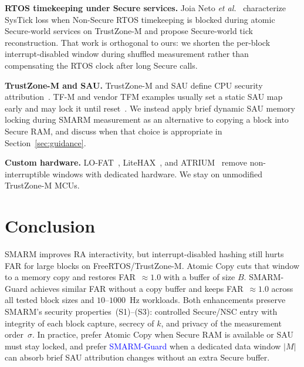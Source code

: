 \documentclass[conference]{IEEEtran}
\newcommand{\smarmlock}{SMARM-Guard\xspace}
\newcommand\ben[1]{\textcolor{blue}{#1}}
\begin{document}
\textbf{RTOS timekeeping under Secure services.}
Joia Neto \emph{et al.}~\cite{joianeto2026timekeeping} characterize
SysTick loss when Non-Secure RTOS timekeeping is blocked during atomic
Secure-world services on TrustZone-M and propose Secure-world tick
reconstruction. That work is orthogonal to ours: we shorten the
per-block interrupt-disabled window during shuffled measurement rather
than compensating the RTOS clock after long Secure calls.

\textbf{TrustZone-M and SAU.}
TrustZone-M and SAU define CPU security
attribution~\cite{trustzone2025,armv8m-arm,an5347,cmsis-tz}. TF-M and
vendor TFM examples usually set a static SAU map early and may lock it
until reset~\cite{tfm2024,tfm-isolation,um2851}.
We instead apply brief dynamic SAU memory locking during SMARM
measurement as an alternative to copying a block into Secure RAM, and
discuss when that choice is appropriate in Section~\ref{sec:guidance}.

\textbf{Custom hardware.}
LO-FAT~\cite{lo-fat}, LiteHAX~\cite{litehax}, and ATRIUM~\cite{atrium}
remove non-interruptible windows with dedicated hardware. We stay on
unmodified TrustZone-M MCUs.

\section{Conclusion}
\label{sec:conclusion}

SMARM improves RA interactivity, but interrupt-disabled hashing still
hurts FAR for large blocks on FreeRTOS/TrustZone-M. Atomic Copy cuts
that window to a memory copy and restores FAR~$\approx 1.0$ with a
buffer of size $B$.
\smarmlock{} achieves similar FAR without a copy buffer and keeps
FAR~$\approx 1.0$ across all tested block sizes and $10$--$1000$~Hz
workloads.
Both enhancements preserve SMARM's
security properties~(S1)--(S3): controlled Secure/NSC entry with
integrity of each block capture, secrecy of $k$, and privacy of the
measurement order~$\sigma$. In practice, prefer Atomic Copy when
Secure RAM is available or SAU must stay locked, and prefer \ben\smarmlock
when a dedicated data window $|M|$ can absorb brief SAU attribution
changes without an extra Secure buffer.



\end{document}
